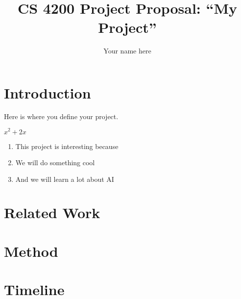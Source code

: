 \documentclass[letterpaper]{article}
\begin{document}
%
\title{CS 4200 Project Proposal: ``My Project''}
\author{Your name here
}
\maketitle
\begin{abstract}
\begin{quote}

\end{quote}
\end{abstract}

\section{Introduction}
Here is where you define your project.


$x^2 + 2x$
\begin{enumerate}
\item This project is interesting because
\item We will do something cool
\item And we will learn a lot about AI
\end{enumerate}


\section{Related Work}

\cite{summervilleuniversity}
\section{Method}

\section{Timeline}










\end{document}
